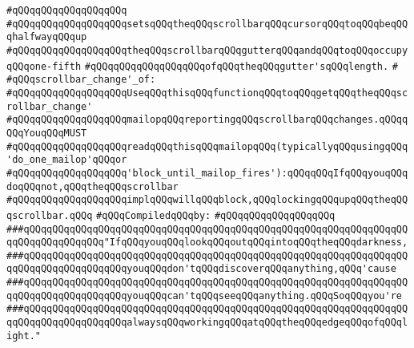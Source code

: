 \verb|#qQQqqQQqqQQqqQQqqQQq|\newline
\verb|#qQQqqQQqqQQqqQQqqQQqsetsqQQqtheqQQqscrollbarqQQqcursorqQQqtoqQQqbeqQQqhalfwayqQQqup|\newline
\verb|#qQQqqQQqqQQqqQQqqQQqtheqQQqscrollbarqQQqgutterqQQqandqQQqtoqQQqoccupyqQQqone-fifth|\newline
\verb|#qQQqqQQqqQQqqQQqqQQqofqQQqtheqQQqgutter'sqQQqlength.|\newline
\verb|#|\newline
\verb|#qQQqscrollbar_change'_of:|\newline
\verb|#qQQqqQQqqQQqqQQqqQQqUseqQQqthisqQQqfunctionqQQqtoqQQqgetqQQqtheqQQqscrollbar_change'|\newline
\verb|#qQQqqQQqqQQqqQQqqQQqmailopqQQqreportingqQQqscrollbarqQQqchanges.qQQqqQQqYouqQQqMUST|\newline
\verb|#qQQqqQQqqQQqqQQqqQQqreadqQQqthisqQQqmailopqQQq(typicallyqQQqusingqQQq'do_one_mailop'qQQqor|\newline
\verb|#qQQqqQQqqQQqqQQqqQQq'block_until_mailop_fires'):qQQqqQQqIfqQQqyouqQQqdoqQQqnot,qQQqtheqQQqscrollbar|\newline
\verb|#qQQqqQQqqQQqqQQqqQQqimplqQQqwillqQQqblock,qQQqlockingqQQqupqQQqtheqQQqscrollbar.qQQq|\newline
\newline
\verb|#qQQqCompiledqQQqby:|\newline
\verb|#qQQqqQQqqQQqqQQqqQQq|\newline
\newline
\newline
\newline
\newline
\newline
\newline
\verb|###qQQqqQQqqQQqqQQqqQQqqQQqqQQqqQQqqQQqqQQqqQQqqQQqqQQqqQQqqQQqqQQqqQQqqQQqqQQqqQQqqQQq"IfqQQqyouqQQqlookqQQqoutqQQqintoqQQqtheqQQqdarkness,|\newline
\verb|###qQQqqQQqqQQqqQQqqQQqqQQqqQQqqQQqqQQqqQQqqQQqqQQqqQQqqQQqqQQqqQQqqQQqqQQqqQQqqQQqqQQqqQQqyouqQQqdon'tqQQqdiscoverqQQqanything,qQQq'cause|\newline
\verb|###qQQqqQQqqQQqqQQqqQQqqQQqqQQqqQQqqQQqqQQqqQQqqQQqqQQqqQQqqQQqqQQqqQQqqQQqqQQqqQQqqQQqqQQqyouqQQqcan'tqQQqseeqQQqanything.qQQqSoqQQqyou're|\newline
\verb|###qQQqqQQqqQQqqQQqqQQqqQQqqQQqqQQqqQQqqQQqqQQqqQQqqQQqqQQqqQQqqQQqqQQqqQQqqQQqqQQqqQQqqQQqalwaysqQQqworkingqQQqatqQQqtheqQQqedgeqQQqofqQQqlight."|\newline
